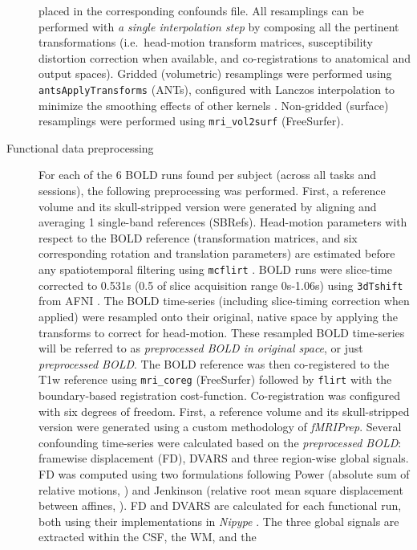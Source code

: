 \documentclass[
]{article}
\begin{document}
\begin{description}
placed in the corresponding confounds file. All resamplings can be
performed with \emph{a single interpolation step} by composing all the
pertinent transformations (i.e.~head-motion transform matrices,
susceptibility distortion correction when available, and
co-registrations to anatomical and output spaces). Gridded (volumetric)
resamplings were performed using \texttt{antsApplyTransforms} (ANTs),
configured with Lanczos interpolation to minimize the smoothing effects
of other kernels \citep{lanczos}. Non-gridded (surface) resamplings were
performed using \texttt{mri\_vol2surf} (FreeSurfer).
\item[Functional data preprocessing]
For each of the 6 BOLD runs found per subject (across all tasks and
sessions), the following preprocessing was performed. First, a reference
volume and its skull-stripped version were generated by aligning and
averaging 1 single-band references (SBRefs). Head-motion parameters with
respect to the BOLD reference (transformation matrices, and six
corresponding rotation and translation parameters) are estimated before
any spatiotemporal filtering using \texttt{mcflirt} \citep[FSL
6.0.5.1:57b01774,][]{mcflirt}. BOLD runs were slice-time corrected to
0.531s (0.5 of slice acquisition range 0s-1.06s) using \texttt{3dTshift}
from AFNI \citep[RRID:SCR\_005927]{afni}. The BOLD time-series
(including slice-timing correction when applied) were resampled onto
their original, native space by applying the transforms to correct for
head-motion. These resampled BOLD time-series will be referred to as
\emph{preprocessed BOLD in original space}, or just \emph{preprocessed
BOLD}. The BOLD reference was then co-registered to the T1w reference
using \texttt{mri\_coreg} (FreeSurfer) followed by \texttt{flirt}
\citep[FSL 6.0.5.1:57b01774,][]{flirt} with the boundary-based
registration \citep{bbr} cost-function. Co-registration was configured
with six degrees of freedom. First, a reference volume and its
skull-stripped version were generated using a custom methodology of
\emph{fMRIPrep}. Several confounding time-series were calculated based
on the \emph{preprocessed BOLD}: framewise displacement (FD), DVARS and
three region-wise global signals. FD was computed using two formulations
following Power (absolute sum of relative motions,
\citet{power_fd_dvars}) and Jenkinson (relative root mean square
displacement between affines, \citet{mcflirt}). FD and DVARS are
calculated for each functional run, both using their implementations in
\emph{Nipype} \citep[following the definitions by][]{power_fd_dvars}.
The three global signals are extracted within the CSF, the WM, and the

\end{description}
\end{document}
